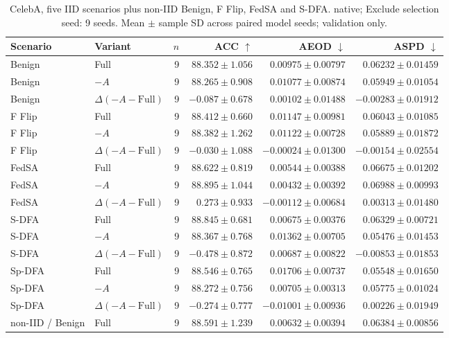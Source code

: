 \begin{table}[t]
\centering
\small
\caption{CelebA, five IID scenarios plus non-IID Benign, F Flip, FedSA and S-DFA. native; Exclude selection seed: 9 seeds. Mean $\pm$ sample SD across paired model seeds; validation only.}
\begin{tabular}{llrrrr}
\toprule
Scenario & Variant & $n$ & ACC $\uparrow$ & AEOD $\downarrow$ & ASPD $\downarrow$ \\
\midrule
Benign & Full & 9 & $88.352 \pm 1.056$ & $0.00975 \pm 0.00797$ & $0.06232 \pm 0.01459$ \\
Benign & $-A$ & 9 & $88.265 \pm 0.908$ & $0.01077 \pm 0.00874$ & $0.05949 \pm 0.01054$ \\
Benign & $\Delta(-A-\mathrm{Full})$ & 9 & $-0.087 \pm 0.678$ & $0.00102 \pm 0.01488$ & $-0.00283 \pm 0.01912$ \\
F Flip & Full & 9 & $88.412 \pm 0.660$ & $0.01147 \pm 0.00981$ & $0.06043 \pm 0.01085$ \\
F Flip & $-A$ & 9 & $88.382 \pm 1.262$ & $0.01122 \pm 0.00728$ & $0.05889 \pm 0.01872$ \\
F Flip & $\Delta(-A-\mathrm{Full})$ & 9 & $-0.030 \pm 1.088$ & $-0.00024 \pm 0.01300$ & $-0.00154 \pm 0.02554$ \\
FedSA & Full & 9 & $88.622 \pm 0.819$ & $0.00544 \pm 0.00388$ & $0.06675 \pm 0.01202$ \\
FedSA & $-A$ & 9 & $88.895 \pm 1.044$ & $0.00432 \pm 0.00392$ & $0.06988 \pm 0.00993$ \\
FedSA & $\Delta(-A-\mathrm{Full})$ & 9 & $0.273 \pm 0.933$ & $-0.00112 \pm 0.00684$ & $0.00313 \pm 0.01480$ \\
S-DFA & Full & 9 & $88.845 \pm 0.681$ & $0.00675 \pm 0.00376$ & $0.06329 \pm 0.00721$ \\
S-DFA & $-A$ & 9 & $88.367 \pm 0.768$ & $0.01362 \pm 0.00705$ & $0.05476 \pm 0.01453$ \\
S-DFA & $\Delta(-A-\mathrm{Full})$ & 9 & $-0.478 \pm 0.872$ & $0.00687 \pm 0.00822$ & $-0.00853 \pm 0.01853$ \\
Sp-DFA & Full & 9 & $88.546 \pm 0.765$ & $0.01706 \pm 0.00737$ & $0.05548 \pm 0.01650$ \\
Sp-DFA & $-A$ & 9 & $88.272 \pm 0.756$ & $0.00705 \pm 0.00313$ & $0.05775 \pm 0.01024$ \\
Sp-DFA & $\Delta(-A-\mathrm{Full})$ & 9 & $-0.274 \pm 0.777$ & $-0.01001 \pm 0.00936$ & $0.00226 \pm 0.01949$ \\
non-IID / Benign & Full & 9 & $88.591 \pm 1.239$ & $0.00632 \pm 0.00394$ & $0.06384 \pm 0.00856$ \\

\end{tabular}
\end{table}
